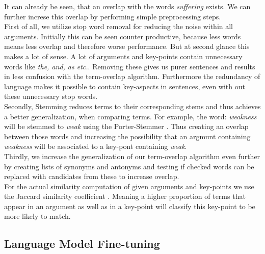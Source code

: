 It can already be seen, that an overlap with the words \textit{suffering} exists. 
We can further increse this overlap by performing simple preprocessing steps.\\
First of all, we utilize stop word removal for reducing the noise within all arguments. Initially this can be seen 
counter productive, because less words means less overlap and therefore worse performance. But at second glance this 
makes a lot of sense. A lot of arguments and key-points contain unnecessary words like \textit{the, and, as etc.}.
Removing these gives us purer sentences and results in less confusion with the term-overlap algorithm. Furthermore the 
redundancy of language makes it possible to contain key-aspects in sentences, even with out these unnecessary stop words.\\
Secondly, Stemming reduces terms to their corresponding stems and thus achieves a better generalization, 
when comparing terms. For example, the word: \textit{weakness} will be stemmed to \textit{weak} using the Porter-Stemmer 
\cite{Porter1980}. Thus creating an overlap between those words and increasing the possibility that an argmunt containing
\textit{weakness} will be associated to a key-pont containing \textit{weak}.\\
Thirdly, we increase the generalization of our term-overlap algorithm even further by creating lists of synonyms and 
antonyms and testing if checked words can be replaced with candidates from these to increase overlap.\\
For the actual similarity computation of given arguments and key-points we use the Jaccard similarity coefficient 
\cite{Jaccard1902}. Meaning a higher proportion of terms that appear in an argument as well as in a key-point will 
classify this key-point to be more likely to match.

\subsection{Language Model Fine-tuning}


